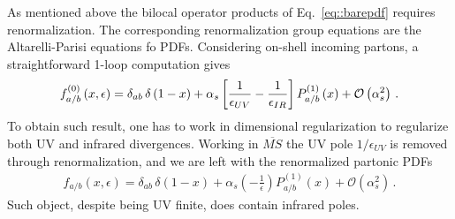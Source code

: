 %
As mentioned above the bilocal operator products of Eq.~\eqref{eq::barepdf} requires renormalization.
The corresponding renormalization group equations are the Altarelli-Parisi equations fo PDFs.
Considering on-shell incoming partons, a straightforward 1-loop computation gives
\begin{align}
    \label{eq:1-loop_bare_partonic_pdf}
    f^{{(0)}}_{a/b}\left(x,\epsilon\right) = \delta_{ab}\,\delta\left(1-x\right)
    + \alpha_s\left[\frac{1}{\epsilon_{UV}}-\frac{1}{\epsilon_{IR}}\right] P_{a/b}^{(1)}\left(x\right)
    + \mathcal{O}\left(\alpha_s^2\right)\,.
\end{align}
To obtain such result, one has to work in dimensional regularization to regularize both UV and infrared
divergences. 
Working in $\overline{MS}$ the UV pole $1/\epsilon_{UV}$ is removed through renormalization,
and we are left with the renormalized partonic PDFs
\begin{align}
    \label{eq:1-loop_renormalized_partonic_pdf}
    f_{a/b}\left(x,\epsilon\right) = \delta_{ab}\,\delta\left(1-x\right)
    + \alpha_s\left(-\frac{1}{\epsilon}\right) P_{a/b}^{(1)}\left(x\right)
    + \mathcal{O}\left(\alpha_s^2\right)\,.
\end{align}
Such object, despite being UV finite, does contain 
infrared poles.

